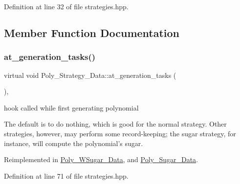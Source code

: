 Definition at line 32 of file strategies.\+hpp.



\subsection{Member Function Documentation}
\mbox{\label{class_poly___strategy___data_a3c2e31f0e3323da59564edc6ee3557af}} 
\subsubsection{\texorpdfstring{at\+\_\+generation\+\_\+tasks()}{at\_generation\_tasks()}\hspace{0.1cm}{\footnotesize\ttfamily [1/2]}}
{\footnotesize\ttfamily virtual void Poly\+\_\+\+Strategy\+\_\+\+Data\+::at\+\_\+generation\+\_\+tasks (\begin{DoxyParamCaption}{ }\end{DoxyParamCaption})\hspace{0.3cm}{\ttfamily [inline]}, {\ttfamily [virtual]}}



hook called while first generating polynomial 

The default is to do nothing, which is good for the normal strategy. Other strategies, however, may perform some record-\/keeping; the sugar strategy, for instance, will compute the polynomial's sugar. 

Reimplemented in \hyperlink{class_poly___w_sugar___data_ac07ee9ee15bd97e5e8befb3f6cec3929}{Poly\+\_\+\+W\+Sugar\+\_\+\+Data}, and \hyperlink{class_poly___sugar___data_ada533e5c56d7f53207a5e8093414dfb3}{Poly\+\_\+\+Sugar\+\_\+\+Data}.



Definition at line 71 of file strategies.\+hpp.

\mbox{\label{class_poly___strategy___data_a6683749a5fb30b6f91075a28899fbfe7}} 
